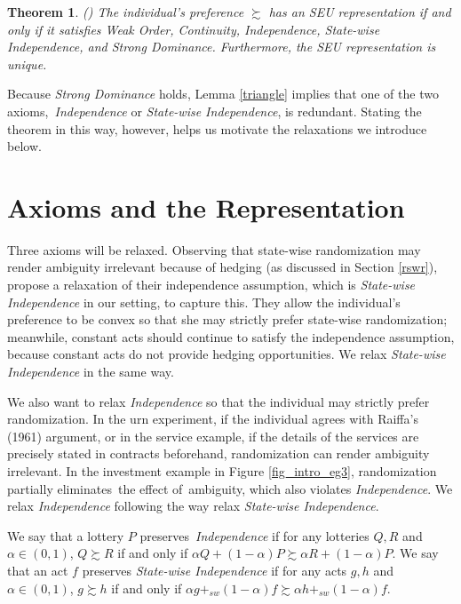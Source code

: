 \documentclass[12pt, notitlepage]{article}
\newtheorem{theorem}{Theorem}
\begin{document}
\begin{theorem}
\label{aa}(\cite{AA63}) The individual's preference $\succsim $ has an SEU
representation if and only if it satisfies Weak Order, Continuity,
Independence, State-wise Independence, and Strong Dominance. Furthermore,
the SEU representation is unique.
\end{theorem}

Because \textit{Strong Dominance} holds, Lemma \ref{triangle} implies that
one of the two axioms,\textit{\ Independence} or \textit{State-wise
Independence}, is redundant. Stating the theorem in this way, however, helps
us motivate the relaxations we introduce below.

\section{Axioms and the Representation}

\label{compare}Three axioms will be relaxed. Observing that state-wise
randomization may render ambiguity irrelevant because of hedging (as
discussed in Section \ref{rswr}), \cite{GilboaSchmeidler89} propose a
relaxation of their independence assumption, which is \textit{State-wise
Independence} in our setting, to capture this. They allow the individual's
preference to be convex so that she may strictly prefer state-wise
randomization; meanwhile, constant acts should continue to satisfy the
independence assumption, because constant acts do not provide hedging
opportunities. We relax \textit{State-wise Independence} in the same way.

We also want to relax \textit{Independence} so that the individual may
strictly prefer randomization. In the urn experiment, if the individual
agrees with Raiffa's (1961) argument, or in the service example, if the
details of the services are precisely stated in contracts beforehand,
randomization can render ambiguity irrelevant. In the investment example in
Figure \ref{fig_intro_eg3}, randomization partially eliminates\ the effect
of\ ambiguity, which also violates \textit{Independence}. We relax \textit{%
Independence} following the way \cite{GilboaSchmeidler89} relax \textit{%
State-wise Independence}.

We say that a lottery $P$ preserves\textit{\ Independence} if for any
lotteries $Q,R$ and $\alpha \in (0,1)$, $Q\succsim R$ if and only if $\alpha
Q+(1-\alpha )P\succsim \alpha R+(1-\alpha )P$. We say that an act $f$
preserves \textit{State-wise Independence} if for any acts $g,h$ and $\alpha
\in (0,1)$, $g\succsim h$ if and only if $\alpha g+_{sw}(1-\alpha )f\succsim
\alpha h+_{sw}(1-\alpha )f$.
\end{document}
